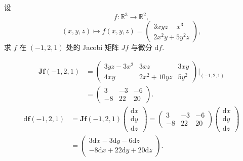 \begin{example}\label{ex:8.2.8}
设
\[
  f: \mathbb{R}^{3} \to \mathbb{R}^{2},
\]
\[
  (x, y, z) \mapsto f(x, y, z) = \begin{pmatrix} 3xyz - x^{3} \\ 2x^{2}y + 5y^{2}z \end{pmatrix},
\]
求 $f$ 在 $(-1, 2, 1)$ 处的 Jacobi 矩阵 $Jf$ 与微分 $\mathrm{d}f$.

\begin{solution}[解法 1]
\begin{align*}
  \boldsymbol{J}\boldsymbol{f}(-1, 2, 1) &= \begin{pmatrix} 3yz - 3x^{2} & 3xz & 3xy \\ 4xy & 2x^{2} + 10yz & 5y^{2} \end{pmatrix}\Big|_{(-1, 2, 1)} \\
  &= \begin{pmatrix} 3 & -3 & -6 \\ -8 & 22 & 20 \end{pmatrix}.
\end{align*}
\begin{align*}
  \mathrm{d}\boldsymbol{f}(-1, 2, 1) &= \boldsymbol{J}\boldsymbol{f}(-1, 2, 1)\begin{pmatrix} \mathrm{d}x \\ \mathrm{d}y \\ \mathrm{d}z \end{pmatrix} = \begin{pmatrix} 3 & -3 & -6 \\ -8 & 22 & 20 \end{pmatrix}\begin{pmatrix} \mathrm{d}x \\ \mathrm{d}y \\ \mathrm{d}z \end{pmatrix} \\
  &= \begin{pmatrix} 3\mathrm{d}x - 3\mathrm{d}y - 6\mathrm{d}z \\ -8\mathrm{d}x + 22\mathrm{d}y + 20\mathrm{d}z \end{pmatrix}.
\end{align*}
\end{solution}


\end{example}
